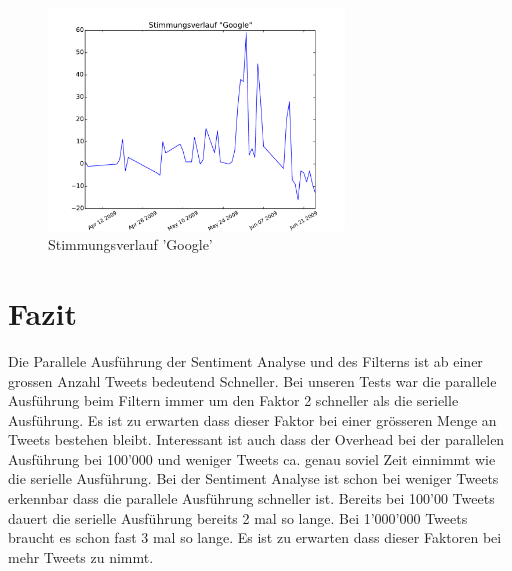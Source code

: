 \documentclass[12pt, oneside]{report}   	%
\begin{document}
\begin{figure}[h]
\begin{center}
\includegraphics[width=0.7\textwidth]{bilder/moodPlotGoogle.pdf}
\caption{Stimmungsverlauf 'Google'}
\label{img:moodplot2}
\end{center}
\end{figure}


\chapter{Fazit}
Die Parallele Ausführung der Sentiment Analyse und des Filterns ist ab einer grossen Anzahl Tweets bedeutend Schneller. Bei unseren Tests war die parallele Ausführung beim Filtern immer um den Faktor 2 schneller als die serielle Ausführung. Es ist zu erwarten dass dieser Faktor bei einer grösseren Menge an Tweets bestehen bleibt. Interessant ist auch dass der Overhead bei der parallelen Ausführung bei 100'000 und weniger Tweets ca. genau soviel Zeit einnimmt wie die serielle Ausführung. \newline{}
Bei der Sentiment Analyse ist schon bei weniger Tweets erkennbar dass die parallele Ausführung schneller ist. Bereits bei 100'00 Tweets dauert die serielle Ausführung bereits 2 mal so lange. Bei 1'000'000 Tweets braucht es schon fast 3 mal so lange. Es ist zu erwarten dass dieser Faktoren bei mehr Tweets zu nimmt.


\end{document}
